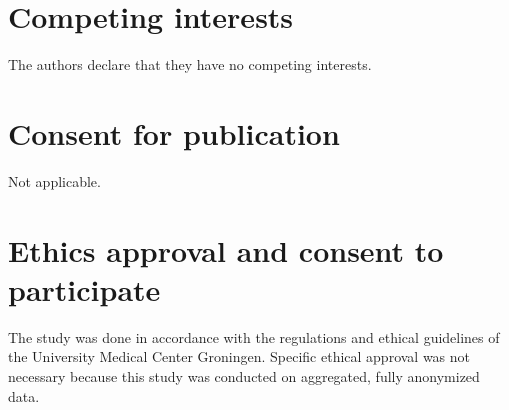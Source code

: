 \section*{Competing interests}
The authors declare that they have no competing interests.

\section*{Consent for publication}
Not applicable.

\section*{Ethics approval and consent to participate}
The study was done in accordance with the regulations and ethical guidelines of the University Medical Center Groningen.
Specific ethical approval was not necessary because this study was conducted on aggregated, fully anonymized data.
